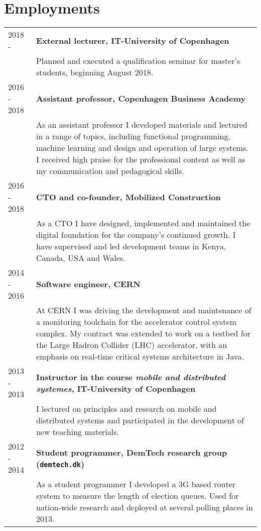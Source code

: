 \documentclass[12pt,a4paper,notitlepage]{article}
\begin{document}
\section*{Employments}
\begin{tabularx}{\textwidth}{l X}
2018 -      & \textbf{External lecturer, IT-University of Copenhagen} \\
            & Planned and executed a qualification seminar for master's students,
              beginning August 2018. \\
2016 - 2018 & \textbf{Assistant professor, Copenhagen Business Academy}\footnotemark[1] \\
            & As an assistant professor I developed materials and lectured in
              a range of topics, including functional programming,
              machine learning and design and operation of large systems.
              I received high praise for the professional content as well as
              my communication and pedagogical skills.\\
2016 - 2018 & \textbf{CTO and co-founder, Mobilized Construction}\footnotemark[1] \\
            & As a CTO I have designed, implemented and maintained the
              digital foundation for the company's continued growth.
              I have supervised and led development teams in Kenya, Canada, USA and Wales.\\
2014 - 2016 & \textbf{Software engineer, CERN}\footnotemark[1] \\
            & At CERN I was driving the development and maintenance of
              a monitoring toolchain for the accelerator control system complex.
              My contract was extended to work on a testbed for the Large Hadron
              Collider (LHC) accelerator, with an emphasis on real-time critical
              systems architecture in Java. \\
2013 - 2013 & \textbf{Instructor in the course \textit{mobile and distributed systemes}, IT-University of Copenhagen} \\
            & I lectured on principles and research on mobile and distributed
              systems and participated in the development of new teaching
              materials. \\
2012 - 2014 & \textbf{Student programmer, DemTech research group (\texttt{demtech.dk})}\footnotemark[1] \\
            & As a student programmer I developed a 3G based router system to
              measure the length of election queues. Used for nation-wide
              research and deployed at several polling places in 2013.
\end{tabularx}
\end{document}
